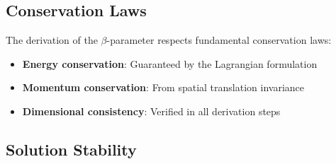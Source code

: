 	\subsection{Conservation Laws}
	\label{subsec:conservation_laws}
	
	The derivation of the $\beta$-parameter respects fundamental conservation laws:
	\begin{itemize}
		\item \textbf{Energy conservation}: Guaranteed by the Lagrangian formulation
		\item \textbf{Momentum conservation}: From spatial translation invariance
		\item \textbf{Dimensional consistency}: Verified in all derivation steps
	\end{itemize}
	
	\subsection{Solution Stability}
	\label{subsec:solution_stability}
	
